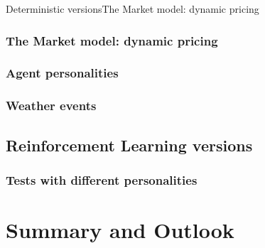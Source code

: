 \documentclass[10pt, aspectratio=169]{beamer}
\def\aa{Deterministic versions}
\def\aac{The Market model: dynamic pricing}
\def\aad{Agent personalities}
\def\aae{Weather events}
\def\ab{Reinforcement Learning versions}
\def\abb{Tests with different personalities}
\def\b{Summary and Outlook}
\begin{document}
\begin{frame}{\aa}{\aac}
\end{frame}

\subsubsection{\aac}
\subsubsection{\aad}
\subsubsection{\aae}

\subsection{\ab}


\subsubsection{\abb}

\section{\b}

\end{document}
